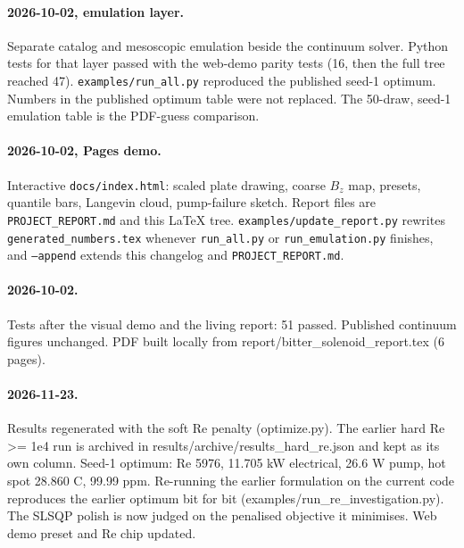
\paragraph{2026-10-02, emulation layer.}
Separate catalog and mesoscopic emulation beside the continuum solver.
Python tests for that layer passed with the web-demo parity tests (16, then the full tree reached 47).
\texttt{examples/run\_all.py} reproduced the published seed-1 optimum.
Numbers in the published optimum table were not replaced.
The 50-draw, seed-1 emulation table is the PDF-guess comparison.

\paragraph{2026-10-02, Pages demo.}
Interactive \texttt{docs/index.html}: scaled plate drawing, coarse \(B_z\) map, presets, quantile bars, Langevin cloud, pump-failure sketch.
Report files are \texttt{PROJECT\_REPORT.md} and this LaTeX tree.
\texttt{examples/update\_report.py} rewrites \texttt{generated\_numbers.tex} whenever \texttt{run\_all.py} or \texttt{run\_emulation.py} finishes, and \texttt{--append} extends this changelog and \texttt{PROJECT\_REPORT.md}.
\paragraph{2026-10-02.}
Tests after the visual demo and the living report: 51 passed. Published continuum figures unchanged. PDF built locally from report/bitter\_solenoid\_report.tex (6 pages).

\paragraph{2026-11-23.}
Results regenerated with the soft Re penalty (optimize.py). The earlier hard Re >= 1e4 run is archived in results/archive/results\_hard\_re.json and kept as its own column. Seed-1 optimum: Re 5976, 11.705 kW electrical, 26.6 W pump, hot spot 28.860 C, 99.99 ppm. Re-running the earlier formulation on the current code reproduces the earlier optimum bit for bit (examples/run\_re\_investigation.py). The SLSQP polish is now judged on the penalised objective it minimises. Web demo preset and Re chip updated.


